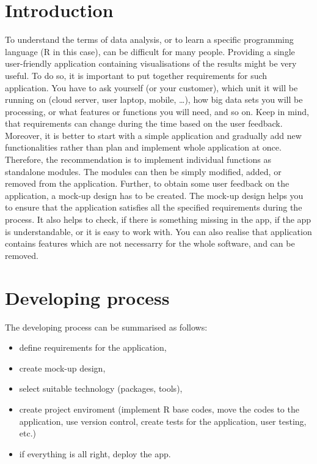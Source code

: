 \documentclass[
]{article}
\providecommand{\tightlist}{%
  \setlength{\itemsep}{0pt}\setlength{\parskip}{0pt}}
\begin{document}
\hypertarget{introduction}{%
\section{Introduction}\label{introduction}}

To understand the terms of data analysis, or to learn a specific
programming language (R in this case), can be difficult for many people.
Providing a single user-friendly application containing visualisations
of the results might be very useful. To do so, it is important to put
together requirements for such application. You have to ask yourself (or
your customer), which unit it will be running on (cloud server, user
laptop, mobile, \ldots), how big data sets you will be processing, or
what features or functions you will need, and so on. Keep in mind, that
requirements can change during the time based on the user feedback.
Moreover, it is better to start with a simple application and gradually
add new functionalities rather than plan and implement whole application
at once. Therefore, the recommendation is to implement individual
functions as standalone modules. The modules can then be simply
modified, added, or removed from the application. Further, to obtain
some user feedback on the application, a mock-up design has to be
created. The mock-up design helps you to ensure that the application
satisfies all the specified requirements during the process. It also
helps to check, if there is something missing in the app, if the app is
understandable, or it is easy to work with. You can also realise that
application contains features which are not necessarry for the whole
software, and can be removed.

\hypertarget{developing-process}{%
\section{Developing process}\label{developing-process}}

The developing process can be summarised as follows:

\begin{itemize}
\tightlist
\item
  define requirements for the application,
\item
  create mock-up design,
\item
  select suitable technology (packages, tools),
\item
  create project enviroment (implement R base codes, move the codes to
  the application, use version control, create tests for the
  application, user testing, etc.)
\item
  if everything is all right, deploy the app.
\end{itemize}
\end{document}
